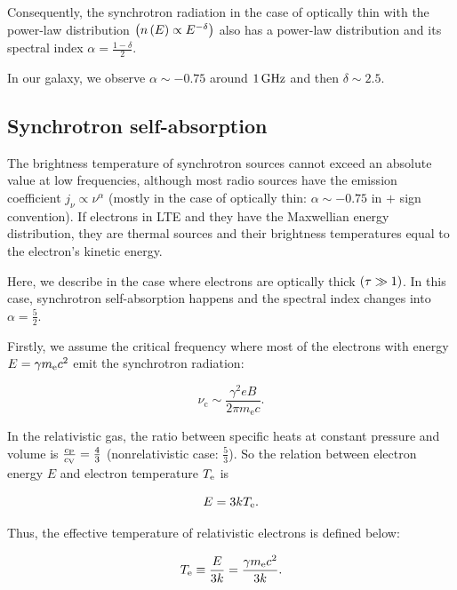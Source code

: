 Consequently, the synchrotron radiation in the case of optically thin with the power-law distribution $\left(n\left(E\right) \propto E^{-\delta}\right)$ also has a power-law distribution and its spectral index $\alpha = \frac{1-\delta}{2}$.

In our galaxy, we observe $\alpha\sim-0.75$ around $1\,\mathrm{GHz}$ and then $\delta \sim 2.5$.



\subsection{Synchrotron self-absorption}\label{synchrotronselfabsorption}

The brightness temperature of synchrotron sources cannot exceed an absolute value at low frequencies, although most radio sources have the emission coefficient $j_{\nu} \propto \nu^{\alpha}$ (mostly in the case of optically thin: $\alpha\sim-0.75$ in $+$ sign convention).
If electrons in LTE and they have the Maxwellian energy distribution, they are thermal sources and their brightness temperatures equal to the electron's kinetic energy.

Here, we describe in the case where electrons are optically thick $\left(\tau \gg 1\right)$.
In this case, synchrotron self-absorption happens and the spectral index changes into $\alpha = \frac{5}{2}$.

Firstly, we assume the critical frequency where most of the electrons with energy $E = \gamma m_{\mathrm{e}} c^2$ emit the synchrotron radiation:

\begin{equation}\label{eq:essential_radio5n80}
    \nu_{\mathrm{c}} \sim \frac{\gamma^{2} e B}{2 \pi m_{\mathrm{e}} c}.
\end{equation}

In the relativistic gas, the ratio between specific heats at constant pressure and volume is $\frac{c_{\mathrm{P}}}{c_{\mathrm{V}}}=\frac{4}{3}$ (nonrelativistic case: $\frac{5}{3}$).
So the relation between electron energy $E$ and electron temperature $T_{\mathrm{e}}$ is

\begin{equation}\label{eq:essential_radio5n82}
    E=3 k T_{\mathrm{e}}.
\end{equation}

Thus, the effective temperature of relativistic electrons is defined below:

\begin{equation}\label{eq:essential_radio5n83}
    T_{\mathrm{e}} \equiv \frac{E}{3 k}=\frac{\gamma m_{\mathrm{e}} c^2}{3 k}.
\end{equation}

